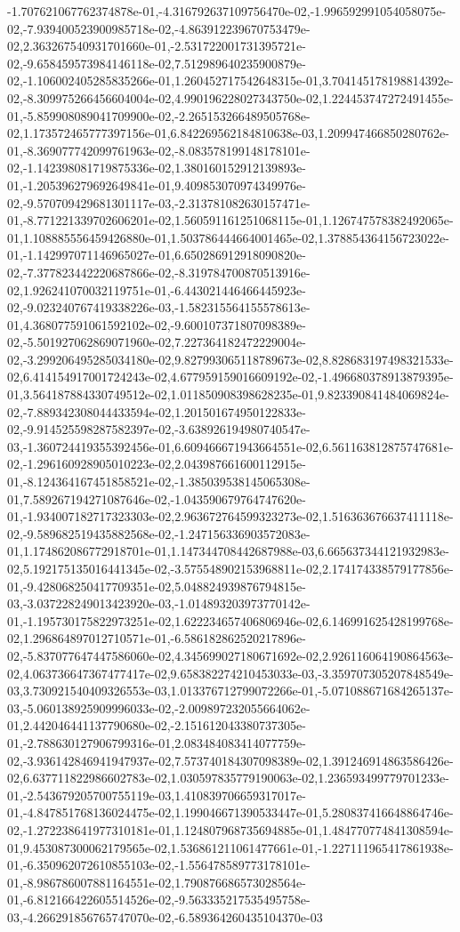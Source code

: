 -1.707621067762374878e-01,-4.316792637109756470e-02,-1.996592991054058075e-02,-7.939400523900985718e-02,-4.863912239670753479e-02,2.363267540931701660e-01,-2.531722001731395721e-02,-9.658459573984146118e-02,7.512989640235900879e-02,-1.106002405285835266e-01,1.260452717542648315e-01,3.704145178198814392e-02,-8.309975266456604004e-02,4.990196228027343750e-02,1.224453747272491455e-01,-5.859908089041709900e-02,-2.265153266489505768e-02,1.173572465777397156e-01,6.842269562184810638e-03,1.209947466850280762e-01,-8.369077742099761963e-02,-8.083578199148178101e-02,-1.142398081719875336e-02,1.380160152912139893e-01,-1.205396279692649841e-01,9.409853070974349976e-02,-9.570709429681301117e-03,-2.313781082630157471e-01,-8.771221339702606201e-02,1.560591161251068115e-01,1.126747578382492065e-01,1.108885556459426880e-01,1.503786444664001465e-02,1.378854364156723022e-01,-1.142997071146965027e-01,6.650286912918090820e-02,-7.377823442220687866e-02,-8.319784700870513916e-02,1.926241070032119751e-01,-6.443021446466445923e-02,-9.023240767419338226e-03,-1.582315564155578613e-01,4.368077591061592102e-02,-9.600107371807098389e-02,-5.501927062869071960e-02,7.227364182472229004e-02,-3.299206495285034180e-02,9.827993065118789673e-02,8.828683197498321533e-02,6.414154917001724243e-02,4.677959159016609192e-02,-1.496680378913879395e-01,3.564187884330749512e-02,1.011850908398628235e-01,9.823390841484069824e-02,-7.889342308044433594e-02,1.201501674950122833e-02,-9.914525598287582397e-02,-3.638926194980740547e-03,-1.360724419355392456e-01,6.609466671943664551e-02,6.561163812875747681e-02,-1.296160928905010223e-02,2.043987661600112915e-01,-8.124364167451858521e-02,-1.385039538145065308e-01,7.589267194271087646e-02,-1.043590679764747620e-01,-1.934007182717323303e-02,2.963672764599323273e-02,1.516363676637411118e-02,-9.589682519435882568e-02,-1.247156336903572083e-01,1.174862086772918701e-01,1.147344708442687988e-03,6.665637344121932983e-02,5.192175135016441345e-02,-3.575548902153968811e-02,2.174174338579177856e-01,-9.428068250417709351e-02,5.048824939876794815e-03,-3.037228249013423920e-03,-1.014893203973770142e-01,-1.195730175822973251e-02,1.622234657406806946e-02,6.146991625428199768e-02,1.296864897012710571e-01,-6.586182862520217896e-02,-5.837077647447586060e-02,4.345699027180671692e-02,2.926116064190864563e-02,4.063736647367477417e-02,9.658382274210453033e-03,-3.359707305207848549e-03,3.730921540409326553e-03,1.013376712799072266e-01,-5.071088671684265137e-03,-5.060138925909996033e-02,-2.009897232055664062e-01,2.442046441137790680e-02,-2.151612043380737305e-01,-2.788630127906799316e-01,2.083484083414077759e-02,-3.936142846941947937e-02,7.573740184307098389e-02,1.391246914863586426e-02,6.637711822986602783e-02,1.030597835779190063e-02,1.236593499779701233e-01,-2.543679205700755119e-03,1.410839706659317017e-01,-4.847851768136024475e-02,1.199046671390533447e-01,5.280837416648864746e-02,-1.272238641977310181e-01,1.124807968735694885e-01,1.484770774841308594e-01,9.453087300062179565e-02,1.536861211061477661e-01,-1.227111965417861938e-01,-6.350962072610855103e-02,-1.556478589773178101e-01,-8.986786007881164551e-02,1.790876686573028564e-01,-6.812166422605514526e-02,-9.563335217535495758e-03,-4.266291856765747070e-02,-6.589364260435104370e-03
